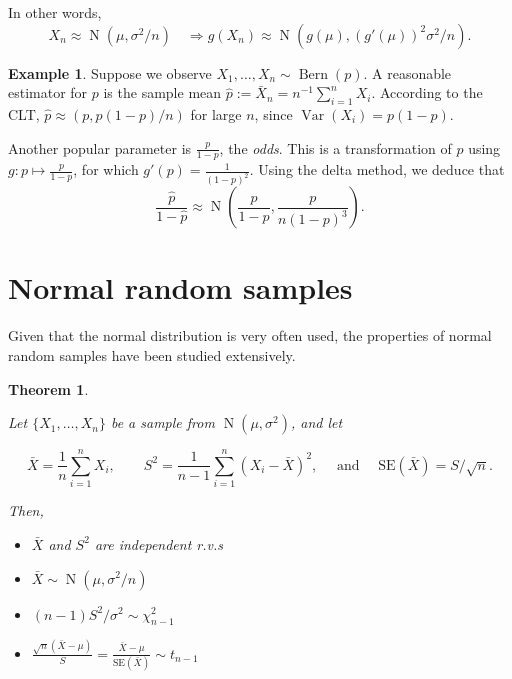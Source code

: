 \documentclass[
]{book}
\providecommand{\tightlist}{%
  \setlength{\itemsep}{0pt}\setlength{\parskip}{0pt}}
\DeclareMathOperator{\Var}{Var}
\DeclareMathOperator{\N}{N}
\DeclareMathOperator{\Bern}{Bern}
\newtheorem{theorem}{Theorem}[chapter]
\theoremstyle{definition}
\theoremstyle{definition}
\newtheorem{example}{Example}[chapter]
\theoremstyle{definition}
\theoremstyle{definition}
\theoremstyle{remark}
\begin{document}
In other words,
\[
  X_n \approx \N\left( \mu, \sigma^2/n \right) \hspace{1em} \Rightarrow g(X_n) \approx \N \left( g(\mu), (g'(\mu))^2\sigma^2/n \right).
\]

\begin{example}
Suppose we observe \(X_1,\dots,X_n\sim\Bern(p)\).
A reasonable estimator for \(p\) is the sample mean \(\hat p := \bar X_n = n^{-1}\sum_{i=1}^n X_i\).
According to the CLT, \(\hat p \approx (p, p(1-p)/n)\) for large \(n\), since \(\Var(X_i)=p(1-p)\).

Another popular parameter is \(\frac{p}{1-p}\), the \textit{odds}.
This is a transformation of \(p\) using \(g:p \mapsto \frac{p}{1-p}\), for which \(g'(p) = \frac{1}{(1-p)^2}\).
Using the delta method, we deduce that
\[
\frac{\hat p}{1-\hat p} \approx \N \left(\frac{p}{1-p}, \frac{p}{n(1-p)^3}  \right).
\]
\end{example}

\hypertarget{normal-random-samples}{%
\section{Normal random samples}\label{normal-random-samples}}

Given that the normal distribution is very often used, the properties of normal random samples have been studied extensively.

\begin{theorem}
\protect\hypertarget{thm:propertynormalsamp}{}\label{thm:propertynormalsamp}

Let \(\{X_1,\dots,X_n \}\) be a sample from \(\N(\mu,\sigma^2)\), and let

\[\bar X = \frac{1}{n}\sum_{i=1}^n X_i, \hspace{2em} 
    S^2 =  \frac{1}{n-1}\sum_{i=1}^n (X_i - \bar X)^2, \hspace{1em} 
    \text{ and } \hspace{1em} \text{SE}(\bar X) = S/\sqrt{n}.\]

Then,

\begin{itemize}
\tightlist
\item
  \(\bar X\) and \(S^2\) are independent r.v.s
\item
  \(\bar X \sim \N(\mu,\sigma^2/n)\)
\item
  \((n-1)S^2/\sigma^2 \sim \chi^2_{n-1}\)
\item
  \(\frac{\sqrt n (\bar X - \mu)}{S} = \frac{\bar X - \mu}{\text{SE}(\bar X)} \sim t_{n-1}\)
\end{itemize}

\end{theorem}
\end{document}
